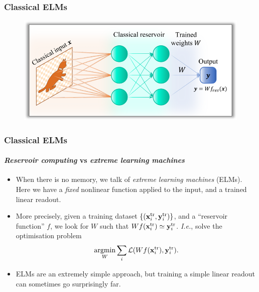 \documentclass{beamer}
\begin{document}
\begin{frame}
\frametitle{Classical ELMs}
\begin{figure}
    \centering
    \includegraphics[width=0.9\linewidth]{figures/scheme_ELM.png}
\end{figure}
\end{frame}

\begin{frame}
\frametitle{Classical ELMs}
\framesubtitle{\textit{Reservoir computing} vs \textit{extreme learning machines}}
\begin{itemize}
    \item When there is no memory, we talk of \textit{extreme learning machines} (ELMs). Here we have a \textit{fixed} nonlinear function applied to the input, and a trained linear readout.
    \item More precisely, given a training dataset $\{(\mathbf x_i^{\rm tr},\mathbf y_i^{\rm tr})\}$, and a ``reservoir function'' $f$, we look for $W$ such that
    $%
        W f(\mathbf x_i^{\rm tr}) \simeq \mathbf y_i^{\rm tr}
    $. %
    \textit{I.e.}, solve the optimisation problem
    \begin{equation}
        \operatorname*{argmin}_W \sum_i \mathcal L(W f(\mathbf x_i^{\rm tr}), \mathbf y_i^{\rm tr}).
    \end{equation}
    \item ELMs are an extremely simple approach, but training a simple linear readout can sometimes go surprisingly far.
\end{itemize}
\end{frame}
\end{document}
